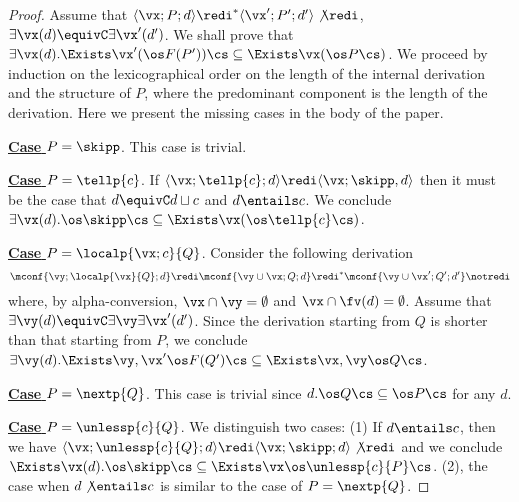 \documentclass{tlp}
\begin{document}
\begin{proof}
Assume that $\langle\vx; P;d\rangle \redi^* \langle \vx'; P';d'\rangle \not\redi$,  $\exists \vx(d) \equivC \exists \vx'(d')$.
 We shall prove that $\exists \vx(d). \Exists \vx' (\os F(P')) \cs \subseteq \Exists \vx(\os P\cs)$. 
	We proceed by induction on the lexicographical order on the length of the internal derivation   and the structure of  $P$, where the predominant component is the length of the derivation. Here we present the missing cases in the body of the paper. 

\noindent \underline{{\bf Case} $P=\skipp$}. This case is trivial. 

\noindent \underline{{\bf Case}  $P=\tellp{c}$}. If $\langle \vx;\tellp{c};d \rangle \redi \langle \vx; \skipp,d \rangle $ then it must be the case that $d\equivC d\sqcup  c$ and  $d\entails c$. We conclude  $\exists \vx(d).\os \skipp \cs \subseteq \Exists \vx(\os \tellp{c}\cs)$. 
	

\noindent \underline{{\bf Case}  $P = \localp{\vx;c}{Q}$}.  Consider the following derivation 
 \[
 \mconf{\vy;\localp{\vx}{Q};d} \redi  \mconf{\vy\cup\vx;Q;d} \redi^* \mconf{\vy\cup\vx';Q';d'}\notredi
 \]
 where, by alpha-conversion,  $\vx \cap \vy = \emptyset$ and $\vx \cap \fv(d) = \emptyset$. Assume that 
   $\exists \vy(d) \equivC \exists \vy \exists\vx'  (d')$. 
 Since the derivation starting from $Q$ is shorter than that starting from $P$, we conclude
$
  \exists \vy(d).\Exists \vy,\vx' \os F(Q')\cs \subseteq \Exists \vx,\vy \os Q\cs$.
 


\noindent \underline{{\bf Case}  $P=\nextp{Q}$}. This case is trivial since
	$d.\os Q\cs \subseteq \os P\cs$ for any $d$. 
	
\noindent \underline{{\bf Case }$P=\unlessp{c}{Q}$}. We distinguish two cases:
(1) If $d \entails c$, then we have $\langle \vx; \unlessp{c}{Q};d\rangle \redi \langle \vx; \skipp ;d \rangle \not\redi$ and  we conclude $\Exists \vx(d).\os \skipp \cs \subseteq \Exists \vx \os \unlessp{c}{P}\cs$. (2), the case when     $d\not\entails c$  is similar to the case of $P=\nextp{Q}$. 

 








\end{proof}
\end{document}
